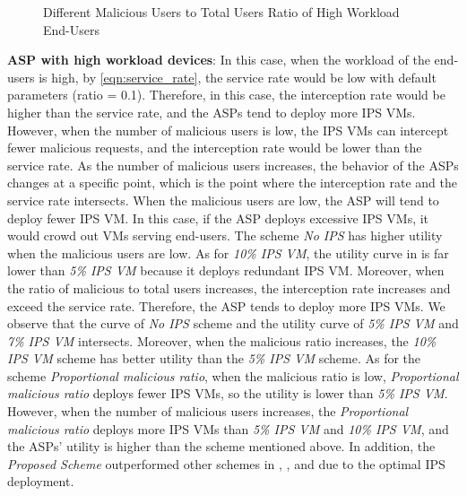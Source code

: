 \documentclass[10pt,journal, compsoc]{IEEEtran}
\begin{document}
\begin{figure}[!]
\captionsetup{justification=centering}
  \hfill
  \hfill
\label{fig:ratio_high}
\caption{Different Malicious Users to Total Users Ratio of High Workload End-Users}
\end{figure}

\textbf{ASP with high workload devices}:  In this case, when the workload of the end-users is high, by \cref{eqn:service_rate}, the service rate would be low with default parameters (ratio = 0.1). Therefore, in this case, the interception rate would be higher than the service rate, and the ASPs tend to deploy more IPS VMs. However, when the number of malicious users is low, the IPS VMs can intercept fewer malicious requests, and the interception rate would be lower than the service rate. As the number of malicious users increases, the behavior of the ASPs changes at a specific point, which is the point where the interception rate and the service rate intersects. When the malicious users are low, the ASP will tend to deploy fewer IPS VM. In this case, if the ASP deploys excessive IPS VMs, it would crowd out VMs serving end-users. The scheme \textit{No IPS} has higher utility when the malicious users are low. As for \textit{10\% IPS VM}, the utility curve in  is far lower than \textit{5\% IPS VM} because it deploys redundant IPS VM. Moreover, when the ratio of malicious to total users increases, the interception rate increases and exceed the service rate. Therefore, the ASP tends to deploy more IPS VMs. We observe that the curve of \textit{No IPS} scheme and the utility curve of \textit{5\% IPS VM} and \textit{7\% IPS VM} intersects. Moreover, when the malicious ratio increases, the \textit{10\% IPS VM} scheme has better utility than the \textit{5\% IPS VM} scheme. As for the scheme \textit{Proportional malicious ratio}, when the malicious ratio is low, \textit{Proportional malicious ratio} deploys fewer IPS VMs, so the utility is lower than \textit{5\% IPS VM}. However, when the number of malicious users increases, the \textit{Proportional malicious ratio} deploys more IPS VMs than \textit{5\% IPS VM} and \textit{10\% IPS VM}, and the ASPs' utility is higher than the scheme mentioned above. In addition, the \textit{Proposed Scheme} outperformed other schemes in , , and  due to the optimal IPS deployment.
\end{document}
